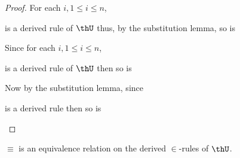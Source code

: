   \begin{proof}
    For each $i, 1 \le i \le n$,
    \begin{mathpar}
    \end{mathpar}
    is a derived rule of $\thU$ thus, by the substitution lemma, so is
    \begin{mathpar}
    \end{mathpar}
    Since for each $i, 1 \le i \le n$,
    \begin{mathpar}
    \end{mathpar}
    is a derived rule of $\thU$ then so is
    \begin{mathpar}
    \end{mathpar}
    Now by the substitution lemma, since
    \begin{mathpar}
    \end{mathpar}
    is a derived rule then so is
    \begin{mathpar}
    \end{mathpar}
  \end{proof}

  \begin{corollary}
    $\equiv$ is an equivalence relation on the derived $\in$-rules of $\thU$.
  \end{corollary}

